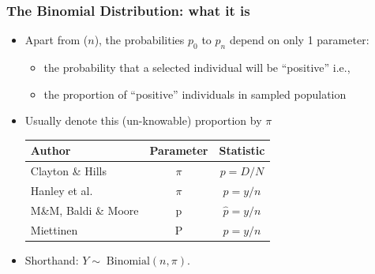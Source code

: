 \documentclass[handout]{beamer}\usepackage[]{graphicx}\usepackage[]{color}
\begin{document}
\begin{frame}
\frametitle{The Binomial Distribution: what it is}
\begin{itemize}
		\setlength\itemsep{0.5em}
	\item Apart from  ($n$), the probabilities $p_{0}$ to $p_{n}$ depend on only 1 parameter:
	\begin{itemize}
		\item the probability that a selected individual will be ``positive''  i.e.,
		\item the proportion of ``positive'' individuals in sampled population
	\end{itemize}

	\item Usually denote this (un-knowable) proportion by $\pi$
	
	\begin{tabular}{lcc}
		\hline
		Author & \textbf{Parameter} & \textbf{Statistic} \\
		\hline
		Clayton \& Hills   & $\pi $ & $p= D/N$ \\
		Hanley et al. & $\pi $ & $p= y/n$ \\
		M\&M, Baldi \& Moore & p &$\hat{p} = y/n$ \\
		Miettinen& P & $p=y/n$ \\
		\hline
	\end{tabular}
	\item
	Shorthand:  $Y\sim\; \textrm{Binomial}(n, \pi)$.
\end{itemize}
\end{frame}


\end{document}
